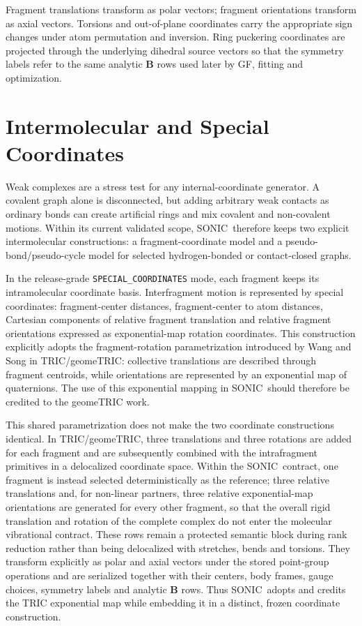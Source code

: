 \documentclass[journal=jctcce,manuscript=article,layout=traditional]{achemso}
\newcommand{\SONIC}{SONIC}
\newcommand{\Bmat}{\mathbf{B}}
\theoremstyle{definition}
\begin{document}
Fragment translations transform as polar vectors; fragment orientations
transform as axial vectors.  Torsions and out-of-plane coordinates carry the
appropriate sign changes under atom permutation and inversion.  Ring puckering
coordinates are projected through the underlying dihedral source vectors so
that the symmetry labels refer to the same analytic \(\Bmat\) rows used later
by GF, fitting and optimization.

\section{Intermolecular and Special Coordinates}

Weak complexes are a stress test for any internal-coordinate generator.  A
covalent graph alone is disconnected, but adding arbitrary weak contacts as
ordinary bonds can create artificial rings and mix covalent and non-covalent
motions.  Within its current validated scope, \SONIC\ therefore keeps two
explicit intermolecular constructions: a fragment-coordinate model
and a pseudo-bond/pseudo-cycle model for selected hydrogen-bonded or
contact-closed graphs.

In the release-grade \texttt{SPECIAL\_COORDINATES} mode, each fragment keeps its
intramolecular coordinate basis.  Interfragment motion is represented by
special coordinates: fragment-center distances, fragment-center to
atom distances, Cartesian components of relative fragment translation and
relative fragment orientations expressed as exponential-map rotation
coordinates.  This construction explicitly adopts the fragment-rotation
parametrization introduced by Wang and Song in TRIC/geomeTRIC: collective
translations are described through fragment centroids, while orientations are
represented by an exponential map of quaternions.\cite{WangSong2016GeomeTRIC}
The use of this exponential mapping in \SONIC\ should therefore be credited to
the geomeTRIC work.

This shared parametrization does not make the two coordinate constructions
identical.  In TRIC/geomeTRIC, three translations and three rotations are added
for each fragment and are subsequently combined with the intrafragment
primitives in a delocalized coordinate space.\cite{WangSong2016GeomeTRIC}
Within the \SONIC\ contract, one fragment is instead selected deterministically
as the reference; three relative translations and, for non-linear partners,
three relative exponential-map orientations are generated for every other
fragment, so that the overall rigid translation and rotation of the complete
complex do not enter the molecular vibrational contract.  These rows remain a
protected semantic block during rank reduction rather than being delocalized
with stretches, bends and torsions.  They transform explicitly as polar and
axial vectors under the stored point-group operations and are serialized
together with their centers, body frames, gauge choices, symmetry labels and
analytic \(\Bmat\) rows.  Thus \SONIC\ adopts and credits the TRIC exponential
map while embedding it in a distinct, frozen coordinate construction.
\end{document}
